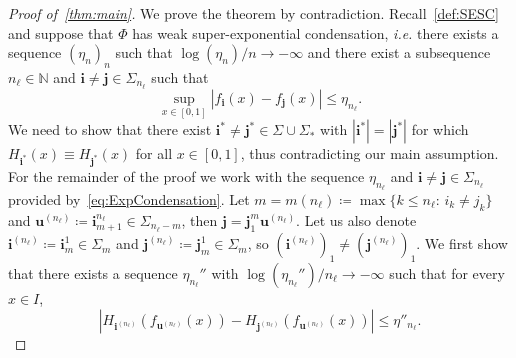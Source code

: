 \documentclass[11pt,a4paper]{article}
\def\cref#1{\ref{#1}}%
\theoremstyle{definition}
\theoremstyle{remark}
\renewcommand{\Bbb}[1]{\mathbb{#1}}
\newcommand{\bbN}{{\Bbb N}}         %
\newcommand{\0}{\mathbf{0}}
\newcommand{\bi}{\mathbf{i}}
\newcommand{\bj}{\mathbf{j}}
\newcommand{\bu}{\mathbf{u}}
\numberwithin{equation}{section}
\begin{document}
\begin{proof}[Proof of~\cref{thm:main}]
We prove the theorem by contradiction. Recall~\cref{def:SESC} and suppose that $\Phi$ has
weak super-exponential condensation, \emph{i.e.} there exists a sequence $(\eta_n)_n$ such that
$\log(\eta_n)/n\to-\infty$ and there exist a subsequence $n_{\ell}\in\bbN$ and
$\bi\neq\bj\in\Sigma_{n_\ell}$ such that
\begin{equation}\label{eq:ExpCondensation}
  \sup_{x\in[0,1]}|f_{\bi}(x)-f_{\bj}(x)| \leq \eta_{n_\ell}.
\end{equation}
We need to show that there exist $\bi^*\neq\bj^*\in\Sigma\cup\Sigma_*$ with $|\bi^*|=|\bj^*|$ for
which $H_{\bi^*}(x)\equiv
H_{\bj^*}(x)$ for all $x\in[0,1]$, thus contradicting our main assumption. For the remainder of the proof
we work with the sequence $\eta_{n_{\ell}}$ and $\bi\neq\bj\in\Sigma_{n_\ell}$ provided
by~\cref{eq:ExpCondensation}. Let $m=m(n_{\ell})\coloneqq\max\{k\leq n_{\ell}:\, i_k\neq j_k\}$ and
$\bu^{(n_{\ell})}\coloneqq \bi_{m+1}^{n_{\ell}}\in\Sigma_{n_\ell-m}$, then
$\bj=\bj_1^m\bu^{(n_{\ell})}$. Let us also denote $\bi^{(n_{\ell})}\coloneqq\bi_m^1\in\Sigma_m$ and
$\bj^{(n_{\ell})}\coloneqq\bj_m^1\in\Sigma_m$, so $(\bi^{(n_{\ell})})_1\neq (\bj^{(n_{\ell})})_1$.
We first show that there exists a sequence $\eta_{n_{\ell}}''$ with
$\log(\eta_{n_{\ell}}'')/n_{\ell}\to-\infty$ such that for every $x\in I$,
\begin{equation}\label{eq:DiffH_iSUperExp}
|H_{\bi^{(n_\ell)}}(f_{\bu^{(n_\ell)}}(x)) - H_{\bj^{(n_\ell)}}(f_{\bu^{(n_\ell)}}(x))| \leq \eta''_{n_\ell}.
\end{equation}


\end{proof}
\end{document}
